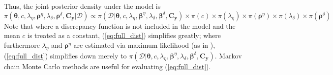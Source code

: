 \documentclass{article}
\begin{document}
Thus, the joint posterior density under the model is
\begin{equation} \label{eq:full_dist}
\pi(\boldsymbol \theta,c,\lambda_\eta,\boldsymbol \rho^\eta,\lambda_\delta,\boldsymbol \rho^\delta,\mathbf C_{\mathbf y}|\mathcal D)
\propto \pi(\mathcal D | \boldsymbol \theta,c,\lambda_\eta, \boldsymbol \beta^\eta,\lambda_\delta,\boldsymbol \beta^\delta,\mathbf C_{\mathbf y}) \times \pi(c) \times \pi(\lambda_\eta) \times 
\pi(\boldsymbol \rho^\eta) \times \pi(\lambda_\delta) \times \pi(\boldsymbol \rho^\delta)
\end{equation}
Note that where a discrepancy function is not included in the model and the mean $c$ is treated as a constant, (\ref{eq:full_dist}) simplifies greatly; where furthermore $\lambda_\eta$ and $\boldsymbol \rho^\eta$ are estimated via maximum likelihood (as in  \cite{Kennedy2001}),  (\ref{eq:full_dist}) simplifies down merely to 
$\pi(\mathcal D | \boldsymbol \theta,c,\lambda_\eta, \boldsymbol \beta^\eta,\lambda_\delta,\boldsymbol \beta^\delta,\mathbf C_{\mathbf y})$. Markov chain Monte Carlo methods are useful for evaluating (\ref{eq:full_dist}).
\end{document}
